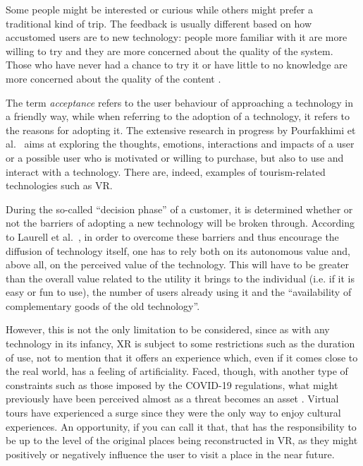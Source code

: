 Some people might be interested or curious while others might prefer a traditional kind of trip. The feedback is usually different based on how accustomed users are to new technology: people more familiar with it are more willing to try and they are more concerned about the quality of the system. Those who have never had a chance to try it or have little to no knowledge are more concerned about the quality of the content \cite{bulchand-gidumal_tourists_2020, pourfakhimi_acceptance_2020}.

The term \emph{acceptance} refers to the user behaviour of approaching a technology in a friendly way, while when referring to the adoption of a technology, it refers to the reasons for adopting it. The extensive research in progress by Pourfakhimi et al.~\cite{pourfakhimi_acceptance_2020} aims at exploring the thoughts, emotions, interactions and impacts of a user or a possible user who is motivated or willing to purchase, but also to use and interact with a technology. There are, indeed, examples of tourism-related technologies such as VR.

During the so-called “decision phase” of a customer, it is determined whether or not the barriers of adopting a new technology will be broken through. According to Laurell et al.~\cite{laurell_exploring_2019}, in order to overcome these barriers and thus encourage the diffusion of technology itself, one has to rely both on its autonomous value and, above all, on the perceived value of the technology. This will have to be greater than the overall value related to the utility it brings to the individual (i.e. if it is easy or fun to use), the number of users already using it and the “availability of complementary goods of the old technology”. 

However, this is not the only limitation to be considered, since as with any technology in its infancy, XR is subject to some restrictions such as the duration of use, not to mention that it offers an experience which, even if it comes close to the real world, has a feeling of artificiality. Faced, though, with another type of constraints such as those imposed by the COVID-19 regulations, what might previously have been perceived almost as a threat becomes an asset \cite{guttentag_virtual_2020}. Virtual tours have experienced a surge since they were the only way to enjoy cultural experiences. An opportunity, if you can call it that, that has the responsibility to be up to the level of the original places being reconstructed in VR, as they might positively or negatively influence the user to visit a place in the near future. 

